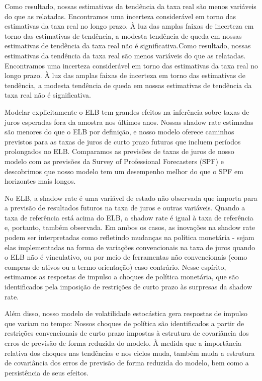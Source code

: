 Como resultado, nossas estimativas da tendência da taxa real são menos variáveis do que as relatadas. Encontramos uma incerteza considerável em torno das estimativas da taxa real no longo prazo. À luz das amplas faixas de incerteza em torno das estimativas de tendência, a modesta tendência de queda em nossas estimativas de tendência da taxa real não é significativa.Como resultado, nossas estimativas da tendência da taxa real são menos variáveis do que as relatadas. Encontramos uma incerteza considerável em torno das estimativas da taxa real no longo prazo. À luz das amplas faixas de incerteza em torno das estimativas de tendência, a modesta tendência de queda em nossas estimativas de tendência da taxa real não é significativa.

Modelar explicitamente o ELB tem grandes efeitos na inferência sobre taxas de juros esperadas fora da amostra nos últimos anos. Nossas shadow rate estimadas são menores do que o ELB por definição, e nosso modelo oferece caminhos previstos para as taxas de juros de curto prazo futuras que incluem períodos prolongados no ELB. Comparamos as previsões de taxas de juros de nosso modelo com as previsões da Survey of Professional Forecasters (SPF) e descobrimos que nosso modelo tem um desempenho melhor do que o SPF em horizontes mais longos.

No ELB, a shadow rate é uma variável de estado não observada que importa para a previsão de resultados futuros na taxa de juros e outras variáveis. Quando a taxa de referência está acima do ELB, a shadow rate é igual à taxa de referência e, portanto, também observada. Em ambos os casos, as inovações na shadow rate podem ser interpretadas como refletindo mudanças na política monetária - sejam elas implementadas na forma de variações convencionais na taxa de juros quando o ELB não é vinculativo, ou por meio de ferramentas não convencionais (como compras de ativos ou a termo orientação) caso contrário. Nesse espírito, estimamos as respostas de impulso a choques de política monetária, que são identificados pela imposição de restrições de curto prazo às surpresas da shadow rate.

Além disso, nosso modelo de volatilidade estocástica gera respostas de impulso que variam no tempo: Nossos choques de política são identificados a partir de restrições convencionais de curto prazo impostas à estrutura de covariância dos erros de previsão de forma reduzida do modelo. À medida que a importância relativa dos choques nas tendências e nos ciclos muda, também muda a estrutura de covariância dos erros de previsão de forma reduzida do modelo, bem como a persistência de seus efeitos.

